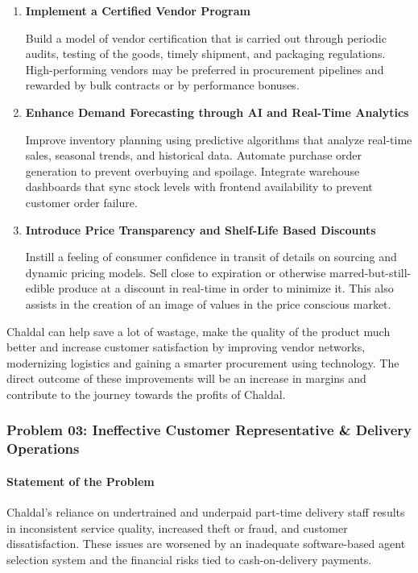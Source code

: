 \documentclass[12pt,a4paper]{article}
\begin{document}
\begin{enumerate}
    \item \textbf{Implement a Certified Vendor Program}
    
    Build a model of vendor certification that is carried out through periodic audits, testing of the goods, timely shipment, and packaging regulations. High-performing vendors may be preferred in procurement pipelines and rewarded by bulk contracts or by performance bonuses.
    
    \item \textbf{Enhance Demand Forecasting through AI and Real-Time Analytics}
    
    Improve inventory planning using predictive algorithms that analyze real-time sales, seasonal trends, and historical data. Automate purchase order generation to prevent overbuying and spoilage. Integrate warehouse dashboards that sync stock levels with frontend availability to prevent customer order failure.
    
    \item \textbf{Introduce Price Transparency and Shelf-Life Based Discounts}
    
    Instill a feeling of consumer confidence in transit of details on sourcing and dynamic pricing models. Sell close to expiration or otherwise marred-but-still-edible produce at a discount in real-time in order to minimize it. This also assists in the creation of an image of values in the price conscious market.

\end{enumerate}

Chaldal can help save a lot of wastage, make the quality of the product much better and increase customer satisfaction by improving vendor networks, modernizing logistics and gaining a smarter procurement using technology. The direct outcome of these improvements will be an increase in margins and contribute to the journey towards the profits of Chaldal.

\subsubsection{Problem 03: Ineffective Customer Representative \& Delivery Operations}

\paragraph{Statement of the Problem}

Chaldal’s reliance on undertrained and underpaid part-time delivery staff results in inconsistent service quality, increased theft or fraud, and customer dissatisfaction. These issues are worsened by an inadequate software-based agent selection system and the financial risks tied to cash-on-delivery payments.
\end{document}
